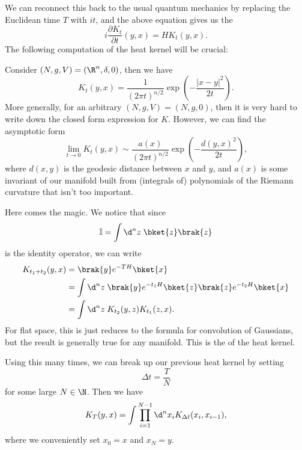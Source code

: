\documentclass[a4paper]{article}
\begin{document}
We can reconnect this back to the usual quantum mechanics by replacing the Euclidean time $T$ with $it$, and the above equation gives us the 
\[
  i \frac{\partial K_t}{\partial t} (y, x) = H K_t(y, x).
\]
The following computation of the heat kernel will be crucial:
\begin{eg}
  Consider $(N, g, V) = (\R^n, \delta, 0)$, then we have
  \[
    K_t(y, x) = \frac{1}{(2\pi t)^{n/2}} \exp\left(-\frac{|x - y|^2}{2t}\right).
  \]
  More generally, for an arbitrary $(N, g, V) = (N, g, 0)$, then it is very hard to write down the closed form expression for $K$. However, we can find the asymptotic form
  \[
    \lim_{t \to 0} K_t(y, x) \sim \frac{a(x)}{(2\pi t)^{n/2}} \exp\left(- \frac{d(y, x)^2}{2t}\right),
  \]
  where $d(x, y)$ is the geodesic distance between $x$ and $y$, and $a(x)$ is some invariant of our manifold built from (integrals of) polynomials of the Riemann curvature that isn't too important.
\end{eg}
Here comes the magic. We notice that since
\[
  \mathbb{I} = \int \d^n z\; \bket{z} \brak{z}
\]
is the identity operator, we can write
\begin{align*}
  K_{t_1 + t_2} (y, x) &= \brak{y} e^{-TH} \bket{x}\\
  &= \int \d^n z\; \brak{y} e^{-t_1H} \bket{z}\brak{z} e^{-t_2H} \bket{x} \\
  &= \int \d^n z\; K_{t_2}(y, z) K_{t_1}(z, x).
\end{align*}
For flat space, this is just reduces to the formula for convolution of Gaussians, but the result is generally true for any manifold. This is the  of the heat kernel.

Using this many times, we can break up our previous heat kernel by setting
\[
  \Delta t = \frac{T}{N}
\]
for some large $N \in \N$. Then we have
\[
  K_T(y, x) = \int \prod_{i = 1}^{N - 1} \d^n x_i K_{\Delta t} (x_i, x_{i - 1}),
\]
where we conveniently set $x_0 = x$ and $x_N = y$.
\end{document}
